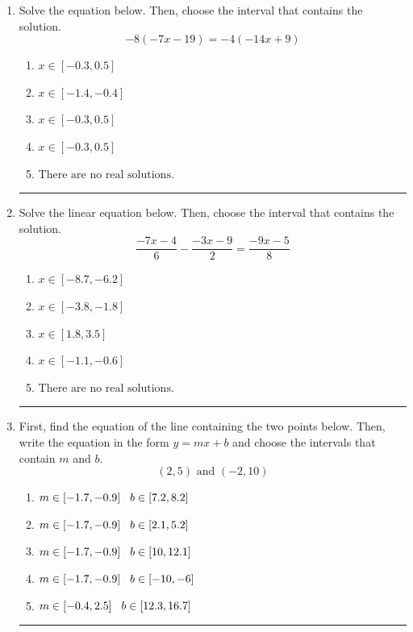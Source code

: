 \documentclass[14pt]{extbook}
\newcommand{\litem}[1]{\item#1\hspace*{-1cm}\rule{\textwidth}{0.4pt}}
\begin{document}
\begin{enumerate}
{\begin{enumerate}[label=\Alph*.]
\end{enumerate} }
\litem{
Solve the equation below. Then, choose the interval that contains the solution.\[ -8(-7x -19) = -4(-14x + 9) \]\begin{enumerate}[label=\Alph*.]
\item \( x \in [-0.3, 0.5] \)
\item \( x \in [-1.4, -0.4] \)
\item \( x \in [-0.3, 0.5] \)
\item \( x \in [-0.3, 0.5] \)
\item \( \text{There are no real solutions.} \)

\end{enumerate} }
\litem{
Solve the linear equation below. Then, choose the interval that contains the solution.\[ \frac{-7x -4}{6} - \frac{-3x -9}{2} = \frac{-9x -5}{8} \]\begin{enumerate}[label=\Alph*.]
\item \( x \in [-8.7, -6.2] \)
\item \( x \in [-3.8, -1.8] \)
\item \( x \in [1.8, 3.5] \)
\item \( x \in [-1.1, -0.6] \)
\item \( \text{There are no real solutions.} \)

\end{enumerate} }
\litem{
First, find the equation of the line containing the two points below. Then, write the equation in the form $ y=mx+b $ and choose the intervals that contain $m$ and $b$.\[ (2, 5) \text{ and } (-2, 10) \]\begin{enumerate}[label=\Alph*.]
\item \( m \in [-1.7, -0.9] \hspace*{3mm} b \in [7.2, 8.2] \)
\item \( m \in [-1.7, -0.9] \hspace*{3mm} b \in [2.1, 5.2] \)
\item \( m \in [-1.7, -0.9] \hspace*{3mm} b \in [10, 12.1] \)
\item \( m \in [-1.7, -0.9] \hspace*{3mm} b \in [-10, -6] \)
\item \( m \in [-0.4, 2.5] \hspace*{3mm} b \in [12.3, 16.7] \)


\end{enumerate}}
\end{enumerate}
\end{document}
